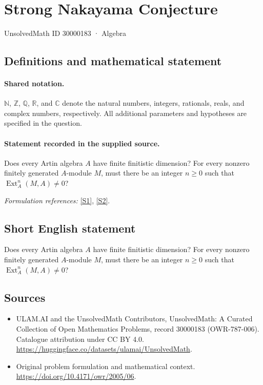 \documentclass[11pt]{article}
\newcommand{\sref}[2]{\hyperlink{source:#1:#2}{[S#2]}}
\begin{document}
\setcounter{section}{30000182}
\section{Strong Nakayama Conjecture}\label{30000183}
{\small UnsolvedMath ID 30000183 · Algebra}
\subsection{Definitions and mathematical statement}

\paragraph{Shared notation.}$\mathbb N$, $\mathbb Z$, $\mathbb Q$, $\mathbb R$, and $\mathbb C$ denote the natural numbers, integers, rationals, reals, and complex numbers, respectively. All additional parameters and hypotheses are specified in the question.


\paragraph{Statement recorded in the supplied source.}
Does every Artin algebra $A$ have finite finitistic dimension? For every nonzero finitely generated $A$-module $M$, must there be an integer $n\geq0$ such that $\operatorname{Ext}_A^n(M,A)\neq0$?
\par\smallskip\textit{Formulation references:} \sref{30000183}{1}, \sref{30000183}{2}.
\subsection{Short English statement}
Does every Artin algebra $A$ have finite finitistic dimension? For every nonzero finitely generated $A$-module $M$, must there be an integer $n\geq0$ such that $\operatorname{Ext}_A^n(M,A)\neq0$?
\subsection{Sources}
\begin{itemize}
\item[\hypertarget{source:30000183:1}{S1}] ULAM.AI and the UnsolvedMath Contributors, UnsolvedMath: A Curated Collection of Open Mathematics Problems, record 30000183 (OWR-787-006). Catalogue attribution under CC BY 4.0.
\url{https://huggingface.co/datasets/ulamai/UnsolvedMath}.
\item[\hypertarget{source:30000183:2}{S2}] Original problem formulation and mathematical context.
\url{https://doi.org/10.4171/owr/2005/06}.
\end{itemize}
\label{end:30000183}
\end{document}
